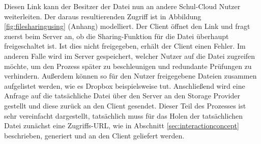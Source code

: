 Diesen Link kann der Besitzer der Datei nun an andere Schul-Cloud Nutzer weiterleiten. Der daraus resultierenden Zugriff ist in Abbildung \ref{fig:filesharingusing} (Anhang) modelliert. Der Client öffnet den Link und fragt zuerst beim Server an, ob die Sharing-Funktion für die Datei überhaupt freigeschaltet ist. Ist dies nicht freigegeben, erhält der Client einen Fehler. Im anderen Falle wird im Server gespeichert, welcher Nutzer auf die Datei zugreifen möchte, um den Prozess später zu beschleunigen und redundante Prüfungen zu verhindern. Außerdem können so für den Nutzer freigegebene Dateien zusammen aufgelistet werden, wie es Dropbox beispielsweise tut. Anschließend wird eine Anfrage auf die tatsächliche Datei über den Server an den Storage Provider gestellt und diese zurück an den Client gesendet. Dieser Teil des Prozesses ist sehr vereinfacht dargestellt, tatsächlich muss für das Holen der tatsächlichen Datei zunächst eine Zugriffs-URL, wie in Abschnitt \ref{sec:interactionconcept} beschrieben, generiert und an den Client geliefert werden.

\clearpage
